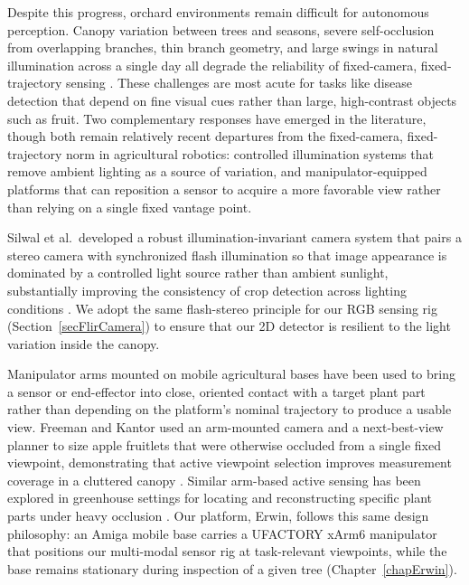 Despite this progress, orchard environments remain difficult for autonomous
perception.
Canopy variation between trees and seasons, severe self-occlusion from
overlapping branches, thin branch geometry, and large swings
in natural illumination across a single day all degrade the reliability of
fixed-camera, fixed-trajectory sensing \cite{droukas2023survey}.
These challenges are most acute for tasks like disease detection that depend
on fine visual cues rather than large, high-contrast objects such as fruit.
Two complementary responses have emerged in the literature, though both remain
relatively recent departures from the fixed-camera, fixed-trajectory norm in
agricultural robotics: controlled illumination systems that remove ambient
lighting as a source of variation, and manipulator-equipped platforms that can
reposition a sensor to acquire a more favorable view rather than relying on a
single fixed vantage point.

Silwal et al.\ developed a robust illumination-invariant camera system that
pairs a stereo camera with synchronized flash illumination so that image
appearance is dominated by a controlled light source rather than ambient
sunlight, substantially improving the consistency of crop detection across
lighting conditions \cite{Silwal2021FlashCamera}.
We adopt the same flash-stereo principle for our RGB sensing rig
(Section~\ref{secFlirCamera}) to ensure that our 2D detector is resilient to 
the light variation inside the canopy.

Manipulator arms mounted on mobile agricultural bases have been used to bring
a sensor or end-effector into close, oriented contact with a target plant part
rather than depending on the platform's nominal trajectory to produce a usable
view.
Freeman and Kantor used an arm-mounted camera and a next-best-view planner to
size apple fruitlets that were otherwise occluded from a single fixed
viewpoint, demonstrating that active viewpoint selection improves measurement
coverage in a cluttered canopy \cite{Freeman2024AppleFruitletSizing}.
Similar arm-based active sensing has been explored in greenhouse settings for
locating and reconstructing specific plant parts under heavy occlusion
\cite{Burusa2024AttentionDrivenNBVPlantParts,
Burusa2024SemanticsAwareNBVPlantParts}.
Our platform, Erwin, follows this same design philosophy: an Amiga mobile base
carries a UFACTORY xArm6 manipulator that positions our multi-modal sensor rig
at task-relevant viewpoints, while the base remains stationary during
inspection of a given tree (Chapter~\ref{chapErwin}).

